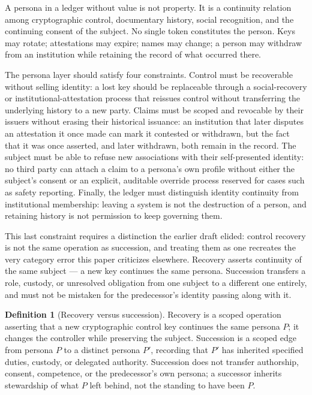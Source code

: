 \documentclass[11pt,oneside]{article}
\theoremstyle{plain}
\theoremstyle{definition}
\newtheorem{definition}{Definition}
\begin{document}
A persona in a ledger without value is not property. It is a continuity relation among cryptographic control, documentary history, social recognition, and the continuing consent of the subject. No single token constitutes the person. Keys may rotate; attestations may expire; names may change; a person may withdraw from an institution while retaining the record of what occurred there.

The persona layer should satisfy four constraints. Control must be recoverable without selling identity: a lost key should be replaceable through a social-recovery or institutional-attestation process that reissues control without transferring the underlying history to a new party. Claims must be scoped and revocable by their issuers without erasing their historical issuance: an institution that later disputes an attestation it once made can mark it contested or withdrawn, but the fact that it was once asserted, and later withdrawn, both remain in the record. The subject must be able to refuse new associations with their self-presented identity: no third party can attach a claim to a persona's own profile without either the subject's consent or an explicit, auditable override process reserved for cases such as safety reporting. Finally, the ledger must distinguish identity continuity from institutional membership: leaving a system is not the destruction of a person, and retaining history is not permission to keep governing them.

This last constraint requires a distinction the earlier draft elided: control recovery is not the same operation as succession, and treating them as one recreates the very category error this paper criticizes elsewhere. Recovery asserts continuity of the same subject --- a new key continues the same persona. Succession transfers a role, custody, or unresolved obligation from one subject to a different one entirely, and must not be mistaken for the predecessor's identity passing along with it.

\begin{definition}[Recovery versus succession]
Recovery is a scoped operation asserting that a new cryptographic control key continues the same persona $P$; it changes the controller while preserving the subject. Succession is a scoped edge from persona $P$ to a distinct persona $P'$, recording that $P'$ has inherited specified duties, custody, or delegated authority. Succession does not transfer authorship, consent, competence, or the predecessor's own persona; a successor inherits stewardship of what $P$ left behind, not the standing to have been $P$.
\end{definition}
\end{document}
